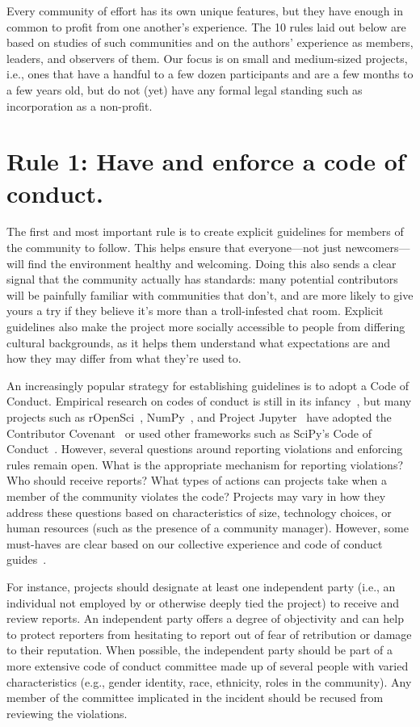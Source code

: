 \documentclass[10pt,letterpaper]{article}
\newcommand{\rulemajor}[1]{\section*{#1}}
\begin{document}
Every community of effort has its own unique features,
but they have enough in common to profit from one another's experience.
The 10 rules laid out below are based on studies of such communities
and on the authors' experience as members,
leaders,
and observers of them.
Our focus is on small and medium-sized projects,
i.e.,
ones that have a handful to a few dozen participants
and are a few months to a few years old,
but do not (yet) have any formal legal standing
such as incorporation as a non-profit.

\rulemajor{Rule 1: Have and enforce a code of conduct.}

The first and most important rule is
to create explicit guidelines for members of the community to follow.
This helps ensure that everyone---not just newcomers---will find the environment healthy and welcoming.
Doing this also sends a clear signal that the community actually has standards:
many potential contributors will be painfully familiar with communities that don't,
and are more likely to give yours a try if they believe
it's more than a troll-infested chat room.
Explicit guidelines also make the project more socially accessible to people from differing cultural backgrounds,
as it helps them understand what expectations are and how they may differ from what they're used to.

An increasingly popular strategy for establishing guidelines is to adopt a Code of Conduct.
Empirical research on codes of conduct is still in its infancy~\cite{tourani2017},
but many projects such as rOpenSci~\cite{ropensci-coc},
NumPy~\cite{numpy-coc},
and Project Jupyter~\cite{jupyter-coc}
have adopted the Contributor Covenant~\cite{covenant}
or used other frameworks such as SciPy's Code of Conduct~\cite{scipy-coc}.
However, several questions around reporting violations and enforcing rules remain open.
What is the appropriate mechanism for reporting violations?
Who should receive reports?
What types of actions can projects take when a member of the community violates the code?
Projects may vary in how they address these questions based on characteristics of size, technology choices, or human resources
(such as the presence of a community manager).
However, some must-haves are clear based on our collective experience and code of conduct guides~\cite{aurora2019}.

For instance,
projects should designate at least one independent party
(i.e., an individual not employed by or otherwise deeply tied the project)
to receive and review reports.
An independent party offers a degree of objectivity
and can help to protect reporters from hesitating to report out of fear of retribution or damage to their reputation.
When possible,
the independent party should be part of a more extensive code of conduct committee made up of several people with varied characteristics
(e.g., gender identity, race, ethnicity, roles in the community).
Any member of the committee implicated in the incident should be recused from reviewing the violations.
\end{document}
